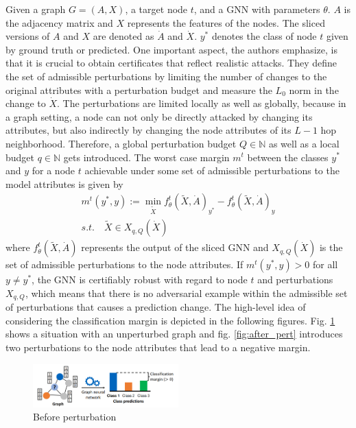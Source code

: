 \documentclass[a4paper,preprint]{sig-alternate}
\begin{document}
Given a graph $G = (A, X)$, a target node $t$, and a GNN with parameters $\theta$. $A$ is the adjacency matrix and $X$ represents the features of the nodes.
The sliced versions of $A$ and $X$ are denoted as $\dot{A}$ and $\dot{X}$. $y^*$ denotes the class of node $t$ given by ground truth or predicted.
One important aspect, the authors emphasize, is that it is crucial to obtain certificates that reflect realistic attacks.
They define the set of admissible perturbations by limiting the number of changes to the original attributes with a perturbation
budget and measure the $L_0$ norm in the change to $\dot{X}$. 
The perturbations are limited locally as well as globally, because in a graph setting, a node can not only be directly attacked by changing
its attributes, but also indirectly by changing the node attributes of its $L-1$ hop neighborhood.
Therefore, a global perturbation budget $Q \in \mathbb{N}$ as well as a local budget $q \in \mathbb{N}$ gets introduced.
The worst case margin $m^t$ between the classes $y^*$ and $y$ for a node $t$ achievable under some set
of admissible perturbations to the model attributes is given by
\begin{gather} 
\label{eq:1}
    m^t (y^*, y) := \min_{\tilde{X}} f_{\theta}^t(\tilde{X}, \dot{A})_{y^*} - f_{\theta}^t(\tilde{X}, \dot{A})_y \\
    s.t. \quad \tilde{X} \in X_{q, Q} (\dot{X}) \nonumber
\end{gather}
where $f_{\theta}^t(\tilde{X}, \dot{A})$ represents the output of the sliced GNN and $X_{q, Q} (\dot{X})$ is the set
of admissible perturbations to the node attributes.
If $m^t (y^*, y) > 0$ for all $y \neq y^*$, the GNN is certifiably robust with regard to node $t$ and perturbations $X_{q, Q}$,
which means that there is no adversarial example within the admissible set of perturbations that causes a prediction change.
The high-level idea of considering the classification margin is depicted in the following figures.
Fig. \ref{fig:before_pert} shows a situation with an unperturbed graph and fig. \ref{fig:after_pert} introduces two
perturbations to the node attributes that lead to a negative margin.

\begin{figure}[h]
    \centering
    \includegraphics[width=0.5\textwidth]{img/before_pert.png}
    \caption{Before perturbation \cite{Zuegner_2019}}
    \label{fig:before_pert}
\end{figure}
\end{document}
